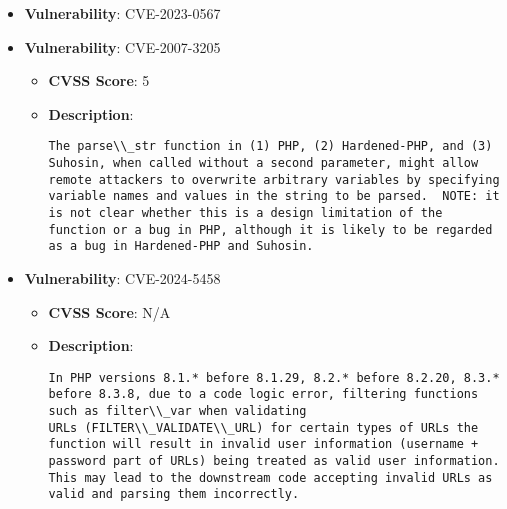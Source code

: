 \documentclass{article}
\begin{document}
\begin{itemize}
\begin{itemize}
{PHP Windows builds for the versions 8.1.29, 8.2.20 and 8.3.8 and above include OpenSSL patches that fix the vulnerability.|
            }
        \end{itemize}
    
        \item \textbf{Vulnerability}: CVE-2023-0567
    
        \item \textbf{Vulnerability}: CVE-2007-3205
        \begin{itemize}
            \item \textbf{CVSS Score}:  5 
            \item \textbf{Description}:
            \parbox[t]{0.9\linewidth}{
                \verb|The parse\\_str function in (1) PHP, (2) Hardened-PHP, and (3) Suhosin, when called without a second parameter, might allow remote attackers to overwrite arbitrary variables by specifying variable names and values in the string to be parsed.  NOTE: it is not clear whether this is a design limitation of the function or a bug in PHP, although it is likely to be regarded as a bug in Hardened-PHP and Suhosin.|
            }
        \end{itemize}
    
        \item \textbf{Vulnerability}: CVE-2024-5458
        \begin{itemize}
            \item \textbf{CVSS Score}:  N/A 
            \item \textbf{Description}:
            \parbox[t]{0.9\linewidth}{
                \verb|In PHP versions 8.1.* before 8.1.29, 8.2.* before 8.2.20, 8.3.* before 8.3.8, due to a code logic error, filtering functions such as filter\\_var when validating URLs (FILTER\\_VALIDATE\\_URL) for certain types of URLs the function will result in invalid user information (username + password part of URLs) being treated as valid user information. This may lead to the downstream code accepting invalid URLs as valid and parsing them incorrectly.|
            }
        \end{itemize}
    

\end{itemize}
\end{document}
